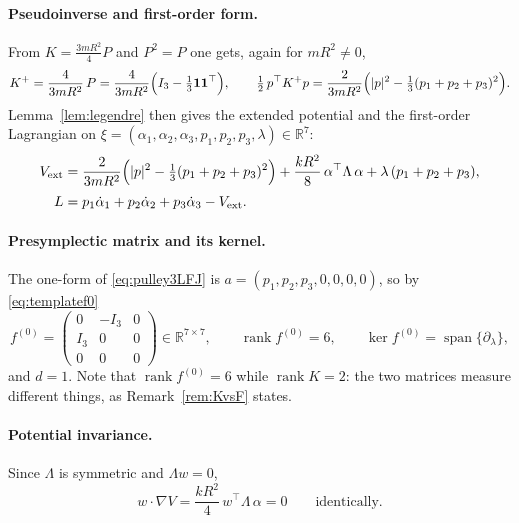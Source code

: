 \documentclass[12pt]{article}
\theoremstyle{plain}
\theoremstyle{definition}
\theoremstyle{remark}
\newcommand{\R}{\mathbb{R}}
\DeclareMathOperator{\rank}{rank}
\DeclareMathOperator{\spn}{span}
\begin{document}
	\paragraph{Pseudoinverse and first-order form.} From $K=\tfrac{3mR^{2}}{4}P$ and
	$P^{2}=P$ one gets, again for $mR^{2}\neq0$,
	\begin{equation}
		K^{+}=\frac{4}{3mR^{2}}\,P
		=\frac{4}{3mR^{2}}\Bigl(I_{3}-\tfrac13\mathbf{1}\mathbf{1}^{\top}\Bigr),
		\qquad
		\tfrac12\,p^{\top}K^{+}p
		=\frac{2}{3mR^{2}}\Bigl(|p|^{2}-\tfrac13(p_{1}+p_{2}+p_{3})^{2}\Bigr).
		\label{eq:pulley3Kplus}
	\end{equation}
	Lemma~\ref{lem:legendre} then gives the extended potential and the first-order
	Lagrangian on $\xi=(\alpha_{1},\alpha_{2},\alpha_{3},p_{1},p_{2},p_{3},\lambda)
	\in\R^{7}$:
	\begin{align}
		V_{\mathrm{ext}}&=\frac{2}{3mR^{2}}
		\Bigl(|p|^{2}-\tfrac13(p_{1}+p_{2}+p_{3})^{2}\Bigr)
		+\frac{kR^{2}}{8}\,\alpha^{\top}\Lambda\,\alpha
		+\lambda\,(p_{1}+p_{2}+p_{3}),
		\label{eq:pulley3Vext}\\[0.2em]
		L&=p_{1}\dot\alpha_{1}+p_{2}\dot\alpha_{2}+p_{3}\dot\alpha_{3}
		-V_{\mathrm{ext}} .
		\label{eq:pulley3LFJ}
	\end{align}
	
	\paragraph{Presymplectic matrix and its kernel.} The one-form of
	\eqref{eq:pulley3LFJ} is $a=(p_{1},p_{2},p_{3},0,0,0,0)$, so by
	\eqref{eq:templatef0}
	\begin{equation}
		f^{(0)}=\begin{pmatrix}0&-I_{3}&0\\ I_{3}&0&0\\ 0&0&0\end{pmatrix}
		\in\R^{7\times7},
		\qquad
		\rank f^{(0)}=6,
		\qquad
		\ker f^{(0)}=\spn\{\partial_{\lambda}\},
		\label{eq:pulley3f0}
	\end{equation}
	and $d=1$. Note that $\rank f^{(0)}=6$ while $\rank K=2$: the two matrices
	measure different things, as Remark~\ref{rem:KvsF} states.
	
	\paragraph{Potential invariance.} Since $\Lambda$ is symmetric and
	$\Lambda w=0$,
	\begin{equation}
		w\!\cdot\!\nabla V=\frac{kR^{2}}{4}\,w^{\top}\Lambda\,\alpha=0
		\qquad\text{identically.}
		\label{eq:pulley3inv}
	\end{equation}
	
\end{document}
